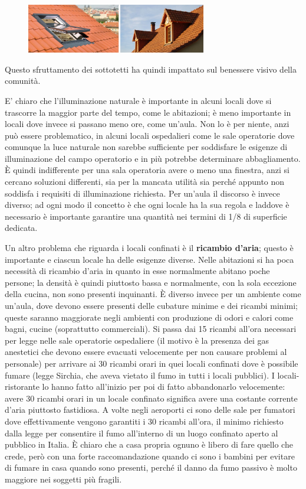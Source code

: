\begin{figure}[!ht]
\centering
	\includegraphics[width=0.7\textwidth]{23/image8.jpeg}
	\end{figure}

Questo sfruttamento dei sottotetti ha quindi impattato sul benessere
visivo della comunità.

E' chiaro che l'illuminazione naturale è importante in alcuni locali
dove si trascorre la maggior parte del tempo, come le abitazioni; è meno
importante in locali dove invece si passano meno ore, come un'aula. Non
lo è per niente, anzi può essere problematico, in alcuni locali
ospedalieri come le sale operatorie dove comunque la luce naturale non
sarebbe sufficiente per soddisfare le esigenze di illuminazione del
campo operatorio e in più potrebbe determinare abbagliamento. È quindi
indifferente per una sala operatoria avere o meno una finestra, anzi si
cercano soluzioni differenti, sia per la mancata utilità sia perché
appunto non soddisfa i requisiti di illuminazione richiesta. Per un'aula
il discorso è invece diverso; ad ogni modo il concetto è che ogni locale
ha la sua regola e laddove è necessario è importante garantire una
quantità nei termini di 1/8 di superficie dedicata.

Un altro problema che riguarda i locali confinati è il \textbf{ricambio
d'aria}; questo è importante e ciascun locale ha delle esigenze diverse.
Nelle abitazioni si ha poca necessità di ricambio d'aria in quanto in
esse normalmente abitano poche persone; la densità è quindi piuttosto
bassa e normalmente, con la sola eccezione della cucina, non sono
presenti inquinanti. È diverso invece per un ambiente come un'aula, dove
devono essere presenti delle cubature minime e dei ricambi minimi;
queste saranno maggiorate negli ambienti con produzione di odori e
calori come bagni, cucine (soprattutto commerciali). Si passa dai 15
ricambi all'ora necessari per legge nelle sale operatorie ospedaliere
(il motivo è la presenza dei gas anestetici che devono essere evacuati
velocemente per non causare problemi al personale) per arrivare ai 30
ricambi orari in quei locali confinati dove è possibile fumare (legge
Sirchia, che aveva vietato il fumo in tutti i locali pubblici). I
locali-ristorante lo hanno fatto all'inizio per poi di fatto
abbandonarlo velocemente: avere 30 ricambi orari in un locale confinato
significa avere una costante corrente d'aria piuttosto fastidiosa. A
volte negli aeroporti ci sono delle sale per fumatori dove
effettivamente vengono garantiti i 30 ricambi all'ora, il minimo
richiesto dalla legge per consentire il fumo all'interno di un luogo
confinato aperto al pubblico in Italia. È chiaro che a casa propria
ognuno è libero di fare quello che crede, però con una forte
raccomandazione quando ci sono i bambini per evitare di fumare in casa
quando sono presenti, perché il danno da fumo passivo è molto maggiore
nei soggetti più fragili.

